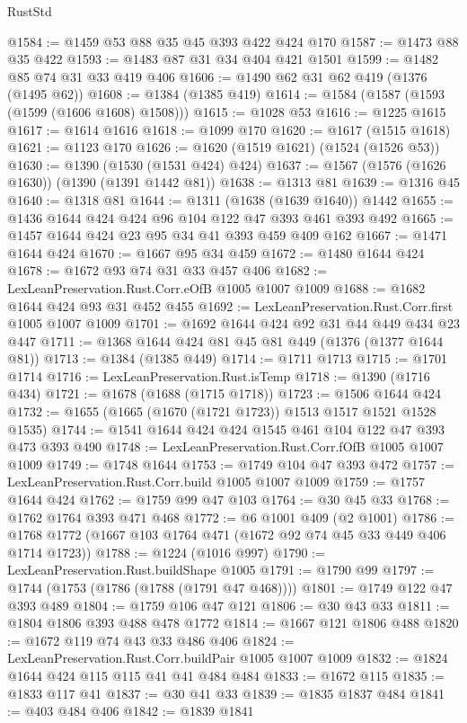 \begin{lexlean}{RustStd}
\begin{coremodule}
@1584 := @1459 @53 @88 @35 @45 @393 @422 @424 @170
@1587 := @1473 @88 @35 @422
@1593 := @1483 @87 @31 @34 @404 @421 @1501
@1599 := @1482 @85 @74 @31 @33 @419 @406
@1606 := @1490 @62 @31 @62 @419 (@1376 (@1495 @62))
@1608 := @1384 (@1385 @419)
@1614 := @1584 (@1587 (@1593 (@1599 (@1606 @1608) @1508)))
@1615 := @1028 @53
@1616 := @1225 @1615
@1617 := @1614 @1616
@1618 := @1099 @170
@1620 := @1617 (@1515 @1618)
@1621 := @1123 @170
@1626 := @1620 (@1519 @1621) (@1524 (@1526 @53))
@1630 := @1390 (@1530 (@1531 @424) @424)
@1637 := @1567 (@1576 (@1626 @1630)) (@1390 (@1391 @1442 @81))
@1638 := @1313 @81
@1639 := @1316 @45
@1640 := @1318 @81
@1644 := @1311 (@1638 (@1639 @1640)) @1442
@1655 := @1436 @1644 @424 @424 @96 @104 @122 @47 @393 @461 @393 @492
@1665 := @1457 @1644 @424 @23 @95 @34 @41 @393 @459 @409 @162
@1667 := @1471 @1644 @424
@1670 := @1667 @95 @34 @459
@1672 := @1480 @1644 @424
@1678 := @1672 @93 @74 @31 @33 @457 @406
@1682 := LexLeanPreservation.Rust.Corr.eOfB @1005 @1007 @1009
@1688 := @1682 @1644 @424 @93 @31 @452 @455
@1692 := LexLeanPreservation.Rust.Corr.first @1005 @1007 @1009
@1701 := @1692 @1644 @424 @92 @31 @44 @449 @434 @23 @447
@1711 := @1368 @1644 @424 @81 @45 @81 @449 (@1376 (@1377 @1644 @81))
@1713 := @1384 (@1385 @449)
@1714 := @1711 @1713
@1715 := @1701 @1714
@1716 := LexLeanPreservation.Rust.isTemp
@1718 := @1390 (@1716 @434)
@1721 := @1678 (@1688 (@1715 @1718))
@1723 := @1506 @1644 @424
@1732 := @1655 (@1665 (@1670 (@1721 @1723)) @1513 @1517 @1521 @1528 @1535)
@1744 := @1541 @1644 @424 @424 @1545 @461 @104 @122 @47 @393 @473 @393 @490
@1748 := LexLeanPreservation.Rust.Corr.fOfB @1005 @1007 @1009
@1749 := @1748 @1644
@1753 := @1749 @104 @47 @393 @472
@1757 := LexLeanPreservation.Rust.Corr.build @1005 @1007 @1009
@1759 := @1757 @1644 @424
@1762 := @1759 @99 @47 @103
@1764 := @30 @45 @33
@1768 := @1762 @1764 @393 @471 @468
@1772 := @6 @1001 @409 (@2 @1001)
@1786 := @1768 @1772 (@1667 @103 @1764 @471 (@1672 @92 @74 @45 @33 @449 @406 @1714 @1723))
@1788 := @1224 (@1016 @997)
@1790 := LexLeanPreservation.Rust.buildShape @1005
@1791 := @1790 @99
@1797 := @1744 (@1753 (@1786 (@1788 (@1791 @47 @468))))
@1801 := @1749 @122 @47 @393 @489
@1804 := @1759 @106 @47 @121
@1806 := @30 @43 @33
@1811 := @1804 @1806 @393 @488 @478 @1772
@1814 := @1667 @121 @1806 @488
@1820 := @1672 @119 @74 @43 @33 @486 @406
@1824 := LexLeanPreservation.Rust.Corr.buildPair @1005 @1007 @1009
@1832 := @1824 @1644 @424 @115 @115 @41 @41 @484 @484
@1833 := @1672 @115
@1835 := @1833 @117 @41
@1837 := @30 @41 @33
@1839 := @1835 @1837 @484
@1841 := @403 @484 @406
@1842 := @1839 @1841

\end{coremodule}
\end{lexlean}
